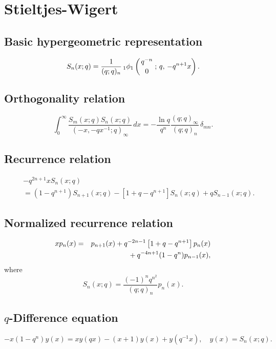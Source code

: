 \documentclass[envcountchap,graybox]{svmono}
\newcommand{\qhyp}[5]{\mbox{}_{#1}{\phi}_{#2}
\left(\genfrac{}{}{0pt}{}{#3}{#4}\,;\,q,\,#5\right)}
\newcommand{\mathindent}{\hspace{7.5mm}}
\begin{document}
\section{Stieltjes-Wigert}
\par\setcounter{equation}{0}

\subsection*{Basic hypergeometric representation}
\begin{equation}
\label{DefStieltjesWigert}
S_n(x;q)=\frac{1}{(q;q)_n}\,\qhyp{1}{1}{q^{-n}}{0}{-q^{n+1}x}.
\end{equation}

\subsection*{Orthogonality relation}
\begin{equation}
\label{OrtStieltjesWigert}
\int_{0}^{\infty}\frac{S_m(x;q)S_n(x;q)}{(-x,-qx^{-1};q)_{\infty}}\,dx
=-\frac{\ln q}{q^n}\frac{(q;q)_{\infty}}{(q;q)_n}\,\delta_{mn}.
\end{equation}

\subsection*{Recurrence relation}
\begin{eqnarray}
\label{RecStieltjesWigert}
& &-q^{2n+1}xS_n(x;q)\nonumber\\
& &{}=(1-q^{n+1})S_{n+1}(x;q)-[1+q-q^{n+1}]S_n(x;q)+qS_{n-1}(x;q).
\end{eqnarray}

\subsection*{Normalized recurrence relation}
\begin{eqnarray}
\label{NormRecStieltjesWigert}
xp_n(x)&=&p_{n+1}(x)+q^{-2n-1}\left[1+q-q^{n+1}\right]p_n(x)\nonumber\\
& &{}\mathindent{}+q^{-4n+1}(1-q^n)p_{n-1}(x),
\end{eqnarray}
where
$$S_n(x;q)=\frac{(-1)^nq^{n^2}}{(q;q)_n}p_n(x).$$

\subsection*{$q$-Difference equation}
\begin{equation}
\label{dvStieltjesWigert}
-x(1-q^n)y(x)=xy(qx)-(x+1)y(x)+y(q^{-1}x),\quad y(x)=S_n(x;q).
\end{equation}
\end{document}
